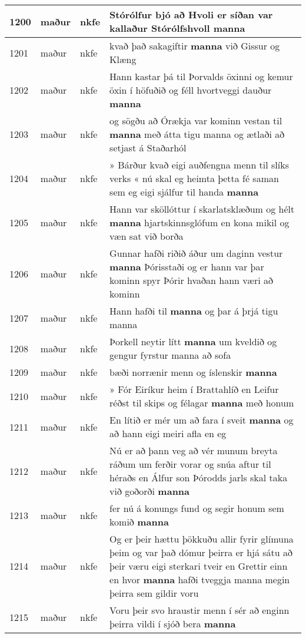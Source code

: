 \documentclass{article}
\begin{document}
\begin{longtable}{p{1cm}|p{1cm}|p{1cm}|p{13cm}}
\hline
1200&maður&nkfe&Stórólfur bjó að Hvoli er síðan var kallaður Stórólfshvoll \textbf{manna} \\
\hline
1201&maður&nkfe&kvað það sakagiftir \textbf{manna} við Gissur og Klæng\\
\hline
1202&maður&nkfe&Hann kastar þá til Þorvalds öxinni og kemur öxin í höfuðið og féll hvortveggi dauður \textbf{manna} \\
\hline
1203&maður&nkfe&og sögðu að Órækja var kominn vestan til \textbf{manna} með átta tigu manna og ætlaði að setjast á Staðarhól\\
\hline
1204&maður&nkfe&» Bárður kvað eigi auðfengna menn til slíks verks « nú skal eg heimta þetta fé saman sem eg eigi sjálfur til handa \textbf{manna} \\
\hline
1205&maður&nkfe&Hann var sköllóttur í skarlatsklæðum og hélt \textbf{manna} hjartskinnsglófum en kona mikil og væn sat við borða\\
\hline
1206&maður&nkfe&Gunnar hafði riðið áður um daginn vestur \textbf{manna} Þórisstaði og er hann var þar kominn spyr Þórir hvaðan hann væri að kominn\\
\hline
1207&maður&nkfe&Hann hafði til \textbf{manna} og þar á þrjá tigu manna\\
\hline
1208&maður&nkfe&Þorkell neytir lítt \textbf{manna} um kveldið og gengur fyrstur manna að sofa\\
\hline
1209&maður&nkfe&bæði norrænir menn og íslenskir \textbf{manna} \\
\hline
1210&maður&nkfe&» Fór Eiríkur heim í Brattahlíð en Leifur réðst til skips og félagar \textbf{manna} með honum\\
\hline
1211&maður&nkfe&En lítið er mér um að fara í sveit \textbf{manna} og að hann eigi meiri afla en eg\\
\hline
1212&maður&nkfe&Nú er að þann veg að vér munum breyta ráðum um ferðir vorar og snúa aftur til héraðs en Álfur son Þórodds jarls skal taka við goðorði \textbf{manna} \\
\hline
1213&maður&nkfe&fer nú á konungs fund og segir honum sem komið \textbf{manna} \\
\hline
1214&maður&nkfe&Og er þeir hættu þökkuðu allir fyrir glímuna þeim og var það dómur þeirra er hjá sátu að þeir væru eigi sterkari tveir en Grettir einn en hvor \textbf{manna} hafði tveggja manna megin þeirra sem gildir voru\\
\hline
1215&maður&nkfe&Voru þeir svo hraustir menn í sér að enginn þeirra vildi í sjóð bera \textbf{manna} \\

\end{longtable}
\end{document}
